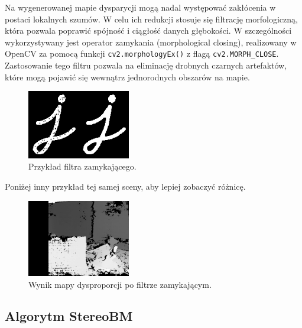 \documentclass[magisterska]{pracadypl}
\begin{document}
Na wygenerowanej mapie dysparycji mogą nadal występować zakłócenia w postaci lokalnych szumów. W celu ich redukcji stosuje się filtrację morfologiczną, która pozwala poprawić spójność i ciągłość danych głębokości. W szczególności wykorzystywany jest operator zamykania (morphological closing), realizowany w OpenCV za pomocą funkcji \texttt{cv2.morphologyEx()} z flagą \texttt{cv2.MORPH\_CLOSE}. Zastosowanie tego filtru pozwala na eliminację drobnych czarnych artefaktów, które mogą pojawić się wewnątrz jednorodnych obszarów na mapie.

\begin{figure}[H]  %
    \centering  %
    \includegraphics[width=0.4\textwidth]{images/closing.png}  %
    \captionsetup{font=footnotesize}
    \caption[Przykład filtra zamykającego. https://docs.opencv.org/3.4/d9/d61/tutorial-py-morphological-ops.html]{Przykład filtra zamykającego.}
\end{figure}

Poniżej inny przykład tej samej sceny, aby lepiej zobaczyć różnicę.

\begin{figure}[H]  %
    \centering  %
    \includegraphics[width=0.4\textwidth]{images/dopracy4.png}  %
    \captionsetup{font=footnotesize}
    \caption[Wynik mapy dysproporcji po filtrze zamykającym. Opracowanie własne.]{Wynik mapy dysproporcji po filtrze zamykającym.}
\end{figure}

\subsection*{Algorytm StereoBM}
\end{document}
